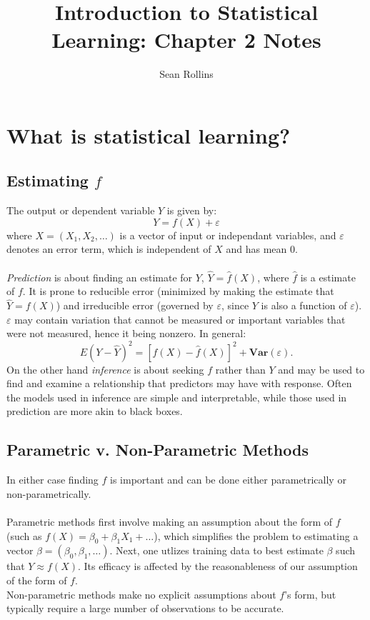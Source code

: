 \documentclass[11pt]{article} %
\title{Introduction to Statistical Learning: Chapter 2 Notes}
\author{Sean Rollins}
\begin{document}
\maketitle

\section{What is statistical learning?}
	\subsection{Estimating $f$}
		The output or dependent variable $Y$ is given by:
		$$ Y = f(X) + \varepsilon$$
		where $X = (X_1, X_2, \dots)$ is a vector of input or independant variables, and $\varepsilon$ denotes an error term, which is independent of $X$ and has mean $0$. \\ \\
		\emph{Prediction} is about finding an estimate for $Y$, $\hat{Y} = \hat{f}(X)$, where $\hat{f}$ is a estimate of $f$. It is prone to reducible error (minimized by making the estimate that $\hat{Y} = f(X)$) and irreducible error (governed by $\varepsilon$, since $Y$ is also a function of $\varepsilon$). $\varepsilon$ may contain variation that cannot be measured or important variables that were not measured, hence it being nonzero. In general:
		$$E(Y - \hat{Y})^2 = [f(X) - \hat{f}(X)]^2 + \mathbf{Var}(\varepsilon).$$
		On the other hand \emph{inference} is about seeking $f$ rather than $Y$ and may be used to find and examine a relationship that predictors may have with response. Often the models used in inference are simple and interpretable, while those used in prediction are more akin to black boxes.
	\subsection{Parametric v. Non-Parametric Methods}
		In either case finding $f$ is important and can be done either parametrically or non-parametrically. \\ \\
		Parametric methods first involve making an assumption about the form of $f$ (such as $f(X) = \beta_0 + \beta_1 X_1 + \dots$), which simplifies the problem to estimating a vector $\beta = (\beta_0, \beta_1, \dots).$ Next, one utlizes training data to best estimate $\beta$ such that $Y \approx f(X).$ Its efficacy is affected by the reasonableness of our assumption of the form of $f.$ \\
		Non-parametric methods make no explicit assumptions about $f$'s form, but typically require a large number of observations to be accurate.
\end{document}
